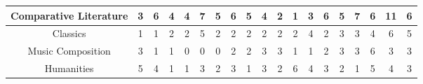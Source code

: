 \documentclass[10]{article}
\begin{document}
\begin{landscape}
\begin{longtable}[c]{|ccccccccccccccccccc|}
	\multicolumn{1}{|c|}{Comparative Literature}                     & \multicolumn{1}{c|}{3}          & \multicolumn{1}{c|}{6}          & \multicolumn{1}{c|}{4}          & \multicolumn{1}{c|}{4}          & \multicolumn{1}{c|}{7}          & \multicolumn{1}{c|}{5}          & \multicolumn{1}{c|}{6}          & \multicolumn{1}{c|}{5}          & \multicolumn{1}{c|}{4}          & \multicolumn{1}{c|}{2}          & \multicolumn{1}{c|}{1}          & \multicolumn{1}{c|}{3}          & \multicolumn{1}{c|}{6}          & \multicolumn{1}{c|}{5}          & \multicolumn{1}{c|}{7}          & \multicolumn{1}{c|}{6}          & \multicolumn{1}{c|}{11}         & 6          \\ \hline
	\multicolumn{1}{|c|}{Classics}                                   & \multicolumn{1}{c|}{1}          & \multicolumn{1}{c|}{1}          & \multicolumn{1}{c|}{2}          & \multicolumn{1}{c|}{2}          & \multicolumn{1}{c|}{5}          & \multicolumn{1}{c|}{2}          & \multicolumn{1}{c|}{2}          & \multicolumn{1}{c|}{2}          & \multicolumn{1}{c|}{2}          & \multicolumn{1}{c|}{2}          & \multicolumn{1}{c|}{2}          & \multicolumn{1}{c|}{4}          & \multicolumn{1}{c|}{2}          & \multicolumn{1}{c|}{3}          & \multicolumn{1}{c|}{3}          & \multicolumn{1}{c|}{4}          & \multicolumn{1}{c|}{6}          & 5          \\ \hline
	\multicolumn{1}{|c|}{Music Composition}                          & \multicolumn{1}{c|}{3}          & \multicolumn{1}{c|}{1}          & \multicolumn{1}{c|}{1}          & \multicolumn{1}{c|}{0}          & \multicolumn{1}{c|}{0}          & \multicolumn{1}{c|}{0}          & \multicolumn{1}{c|}{2}          & \multicolumn{1}{c|}{2}          & \multicolumn{1}{c|}{3}          & \multicolumn{1}{c|}{3}          & \multicolumn{1}{c|}{1}          & \multicolumn{1}{c|}{1}          & \multicolumn{1}{c|}{2}          & \multicolumn{1}{c|}{3}          & \multicolumn{1}{c|}{3}          & \multicolumn{1}{c|}{6}          & \multicolumn{1}{c|}{3}          & 3          \\ \hline
	\multicolumn{1}{|c|}{Humanities}                                 & \multicolumn{1}{c|}{5}          & \multicolumn{1}{c|}{4}          & \multicolumn{1}{c|}{1}          & \multicolumn{1}{c|}{1}          & \multicolumn{1}{c|}{3}          & \multicolumn{1}{c|}{2}          & \multicolumn{1}{c|}{3}          & \multicolumn{1}{c|}{1}          & \multicolumn{1}{c|}{3}          & \multicolumn{1}{c|}{2}          & \multicolumn{1}{c|}{6}          & \multicolumn{1}{c|}{4}          & \multicolumn{1}{c|}{3}          & \multicolumn{1}{c|}{2}          & \multicolumn{1}{c|}{1}          & \multicolumn{1}{c|}{5}          & \multicolumn{1}{c|}{4}          & 3          \\ \hline

\end{longtable}
\end{landscape}
\end{document}
